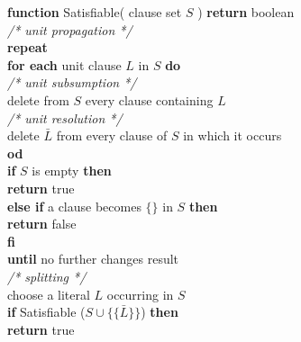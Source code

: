 \begin{listing}[h!]
  \textbf{function} Satisfiable( clause set $S$ ) \textbf{return} boolean\\
    \hspace*{0.5cm} \textit{/* unit propagation */}\\
    \hspace*{0.5cm} \textbf{repeat}\\
      \hspace*{1.0cm} \textbf{for each} unit clause $L$ in $S$ \textbf{do}\\
        \hspace*{1.5cm} \textit{/* unit subsumption */}\\
        \hspace*{1.5cm} delete from $S$ every clause containing $L$\\
        \hspace*{1.5cm} \textit{/* unit resolution */}\\
        \hspace*{1.5cm} delete $\bar{L}$ from every clause of $S$ in which it occurs\\
      \hspace*{1.0cm} \textbf{od}\\
      \hspace*{1.0cm} \textbf{if} $S$ is empty \textbf{then}\\
        \hspace*{1.5cm} \textbf{return} true\\
      \hspace*{1.0cm} \textbf{else if} a clause becomes $\{\}$ in $S$ \textbf{then}\\
        \hspace*{1.5cm} \textbf{return} false\\
      \hspace*{1.0cm} \textbf{fi}\\
    \hspace*{0.5cm} \textbf{until} no further changes result\\
    \hspace*{0.5cm} \textit{/* splitting */}\\
    \hspace*{0.5cm} choose a literal $L$ occurring in $S$\\
    \hspace*{0.5cm} \textbf{if} Satisfiable ($S \cup \{\{\bar{L}\}\}$) \textbf{then}\\
      \hspace*{1.0cm} \textbf{return} true\\

\end{listing}
